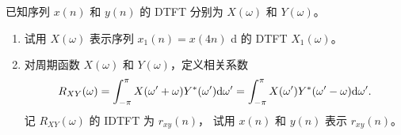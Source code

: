 \begin{exercise}
    已知序列 $x(n)$ 和 $y(n)$ 的 DTFT 分别为 $X(\omega)$ 和 $Y(\omega)$。
    \begin{enumerate}[label=(\arabic*)]
        \item 试用 $X(\omega)$ 表示序列 $x_1(n) = x(4n)$ d 的 DTFT $X_1(\omega)$。
        \item 对周期函数 $X(\omega)$ 和 $Y(\omega)$，定义相关系数
            \begin{align*}
                R_{XY}(\omega) = \int_{-\pi}^{\pi}X(\omega' + \omega)Y^*(\omega')\mathrm{d}\omega'
                    = \int_{-\pi}^{\pi}X(\omega')Y^*(\omega' - \omega)\mathrm{d}\omega'.
            \end{align*}
            记 $R_{XY}(\omega)$ 的 IDTFT 为 $r_{xy}(n)$，
            试用 $x(n)$ 和 $y(n)$ 表示 $r_{xy}(n)$。
    \end{enumerate}
\end{exercise}


